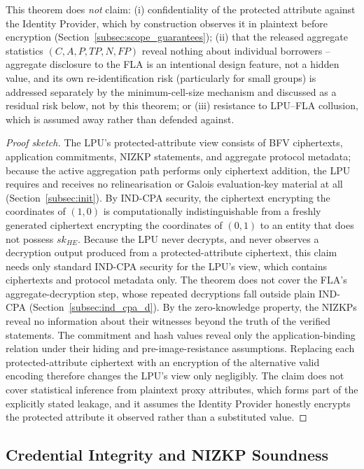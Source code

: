 \documentclass[a4paper,fleqn]{cas-dc}
\begin{document}
{This theorem does \emph{not} claim: (i) confidentiality of the protected attribute against the Identity Provider, which by construction observes it in plaintext before encryption (Section~\ref{subsec:scope_guarantees}); (ii) that the released aggregate statistics $(C,A,P,TP,N,FP)$ reveal nothing about individual borrowers -- aggregate disclosure to the FLA is an intentional design feature, not a hidden value, and its own re-identification risk (particularly for small groups) is addressed separately by the minimum-cell-size mechanism and discussed as a residual risk below, not by this theorem; or (iii) resistance to LPU--FLA collusion, which is assumed away rather than defended against.

\begin{proof}[Proof sketch]

The LPU's protected-attribute view consists of BFV ciphertexts, application commitments, NIZKP statements, and aggregate protocol metadata; because the active aggregation path performs only ciphertext addition, the LPU requires and receives no relinearisation or Galois evaluation-key material at all (Section~\ref{subsec:init}). By IND-CPA security, the ciphertext encrypting the coordinates of $(1,0)$ is computationally indistinguishable from a freshly generated ciphertext encrypting the coordinates of $(0,1)$ to an entity that does not possess $sk_{HE}$. Because the LPU never decrypts, and never observes a decryption output produced from a protected-attribute ciphertext, this claim needs only standard IND-CPA security for the LPU's view, which contains ciphertexts and protocol metadata only. The theorem does not cover the FLA's aggregate-decryption step, whose repeated decryptions fall outside plain IND-CPA (Section~\ref{subsec:ind_cpa_d}). By the zero-knowledge property, the NIZKPs reveal no information about their witnesses beyond the truth of the verified statements. The commitment and hash values reveal only the application-binding relation under their hiding and pre-image-resistance assumptions. Replacing each protected-attribute ciphertext with an encryption of the alternative valid encoding therefore changes the LPU's view only negligibly. The claim does not cover statistical inference from plaintext proxy attributes, which forms part of the explicitly stated leakage, and it assumes the Identity Provider honestly encrypts the protected attribute it observed rather than a substituted value.
\end{proof}

\subsection{Credential Integrity and NIZKP Soundness} 
\label{subsec:credential_integrity} 

}
\end{document}
